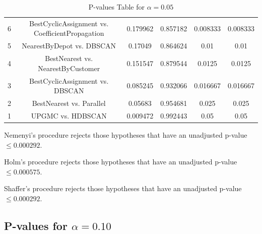 \documentclass[a4paper,10pt]{article}
\begin{document}
\begin{landscape}
\begin{table}[!htp]
\begin{tabular}{cccccc}
6&BestCyclicAssignment vs. CoefficientPropagation&0.179962&0.857182&0.008333&0.008333\\
5&NearestByDepot vs. DBSCAN&0.17049&0.864624&0.01&0.01\\
4&BestNearest vs. NearestByCustomer&0.151547&0.879544&0.0125&0.0125\\
3&BestCyclicAssignment vs. DBSCAN&0.085245&0.932066&0.016667&0.016667\\
2&BestNearest vs. Parallel&0.05683&0.954681&0.025&0.025\\
1&UPGMC vs. HDBSCAN&0.009472&0.992443&0.05&0.05\\
\hline
\end{tabular}
\caption{P-values Table for $\alpha=0.05$}
\end{table}Nemenyi's procedure rejects those hypotheses that have an unadjusted p-value $\le0.000292$.

Holm's procedure rejects those hypotheses that have an unadjusted p-value $\le0.000575$.

Shaffer's procedure rejects those hypotheses that have an unadjusted p-value $\le0.000292$.

\pagebreak

\subsection{P-values for $\alpha=0.10$}


\end{landscape}
\end{document}
